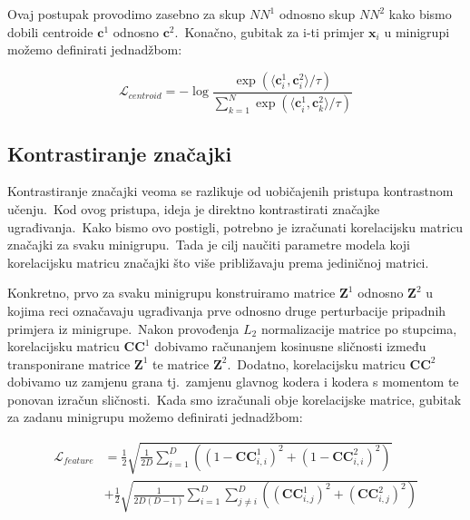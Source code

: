 \documentclass[diplomskirad]{fer}
\begin{document}
\pagebreak

Ovaj postupak provodimo zasebno za skup $NN^1$ odnosno skup $NN^2$ kako bismo dobili centroide $\bm{c}^1$ odnosno $\bm{c}^2$.\ Konačno, gubitak za i-ti primjer $\bm{x}_i$ u minigrupi možemo definirati jednadžbom:

\begin{equation}
  \mathcal{L}_{centroid} = - \log{\frac{\exp(\langle \bm{c}_{i}^{1}, \bm{c}_{i}^{2} \rangle / \tau)}{\sum_{k=1}^{N}{\exp(\langle \bm{c}_{i}^{1}, \bm{c}_{k}^{2} \rangle / \tau)}}}
  \label{eq:centroid_loss}
\end{equation}

\subsection{Kontrastiranje značajki}
\label{sub:znacajke}
  
Kontrastiranje značajki veoma se razlikuje od uobičajenih pristupa kontrastnom učenju.\ Kod ovog pristupa, ideja je direktno kontrastirati značajke ugrađivanja.\ 
Kako bismo ovo postigli, potrebno je izračunati korelacijsku matricu značajki za svaku minigrupu.\ Tada je cilj naučiti parametre modela koji korelacijsku matricu značajki što više približavaju prema jediničnoj matrici.\ 

Konkretno, prvo za svaku minigrupu konstruiramo matrice $\bm{Z}^1$ odnosno $\bm{Z}^2$ u kojima reci označavaju ugrađivanja prve odnosno druge perturbacije pripadnih primjera iz minigrupe.\ 
Nakon provođenja $L_2$ normalizacije matrice po stupcima, korelacijsku matricu $\bm{CC}^1$ dobivamo računanjem kosinusne sličnosti između transponirane matrice $\bm{Z}^1$ te matrice $\bm{Z}^2$.\ 
Dodatno, korelacijsku matricu $\bm{CC}^2$ dobivamo uz zamjenu grana tj.\ zamjenu glavnog kodera i kodera s momentom te ponovan izračun sličnosti.\ 
Kada smo izračunali obje korelacijske matrice, gubitak za zadanu minigrupu možemo definirati jednadžbom:

\begin{equation}
  \begin{aligned}
    \mathcal{L}_{feature} &= \frac{1}{2} \sqrt{\frac{1}{2D}\sum_{i=1}^{D}((1 - \bm{CC}_{i,i}^1)^2 + (1 - \bm{CC}_{i,i}^2)^2)} \\ 
                          &+ \frac{1}{2} \sqrt{\frac{1}{2D(D - 1)}\sum_{i=1}^{D}\sum_{j \neq i}^{D}((\bm{CC}_{i,j}^1)^2 + (\bm{CC}_{i,j}^2)^2)}
  \end{aligned}
  \label{eq:feature_loss}
\end{equation}
\end{document}
